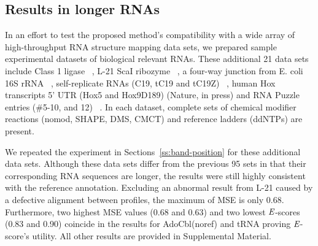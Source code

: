 \subsection{Results in longer RNAs}
In an effort to test the proposed method's compatibility with a wide array of high-throughput RNA structure mapping data sets, we prepared sample experimental datasets of biological relevant RNAs. These additional 21 data sets include Class 1 ligase ~\citep{Bagby01122009}, L-21 ScaI ribozyme ~\citep{Shi2009}, a four-way junction from E. coli 16S rRNA ~\citep{tian2014nature}, self-replicate RNAs (C19, tC19 and tC19Z) ~\citep{Wochner08042011}, human Hox transcripts 5’ UTR (Hox5 and Hox9D189) (Nature, in press) and RNA Puzzle entries (\#5-10, and 12) ~\citep{Cruz01042012}. In each dataset, complete sets of chemical modifier reactions (nomod, SHAPE, DMS, CMCT) and reference ladders (ddNTPs) are present.

We repeated the experiment in Sections~\ref{ss:band-position} for these additional data sets. Although these data sets differ from the previous 95 sets in that their corresponding RNA sequences are longer, the results were still highly consistent with the reference annotation. Excluding an abnormal result from L-21 caused by a defective alignment between profiles, the maximum of MSE is only 0.68. Furthermore, two highest MSE values (0.68 and 0.63) and two lowest ${\emph{E}}$-scores (0.83 and 0.90) coincide in the results for AdoCbl(noref) and tRNA proving ${\emph{E}}$-score's utility. All other results are provided in Supplemental Material.


\begin{comment}
\begin{figure}
\centering
\texttt{[image: ../figures/reactivities]}
\caption{Heatmaps those represent the reactivity values obtained by CE-based analysis and MiSeq, respectively. The data set used is 'C-BACK' sequence.}
\label{f:reactivity-comparison}
\end{figure}

\subsection{Reactivity comparison with miseq}
For the final step of verification, we compared the reactivity data obtained by using the proposed method in conjunction with HiTrace, with that obtained by using MiSeq method. In spite of their separated experimental samples and environments, the two reactivity data sets share a same trend as shown in Figure~\ref{f:reactivity-comparison}, evidencing the consistency between the two distinct analyses in terms of their final results.

\end{comment}
